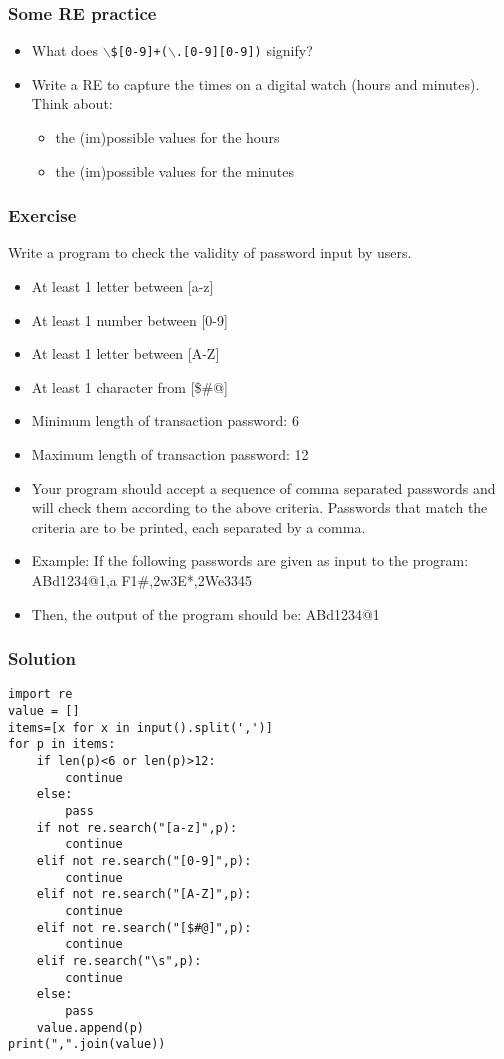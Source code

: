  \begin{frame}[fragile]
\frametitle{Some RE practice}

\begin{itemize}
\item What does \texttt{$\backslash$\$[0-9]+($\backslash$.[0-9][0-9])} signify?
\item Write a RE to capture the times on a digital watch (hours and minutes).  Think about:
	\begin{itemize}
	\item the (im)possible values for the hours
	\item the (im)possible values for the minutes
	\end{itemize}
\end{itemize}
\end{frame}

 \begin{frame}[fragile]\frametitle{Exercise}
Write a program to check the validity of password input by users.
  \begin{itemize}
  \item At least 1 letter between [a-z]
  \item At least 1 number between [0-9]
  \item At least 1 letter between [A-Z]
  \item At least 1 character from [\$\#@]
  \item Minimum length of transaction password: 6
  \item Maximum length of transaction password: 12
  \item Your program should accept a sequence of comma separated passwords and will check them according to the above criteria. Passwords that match the criteria are to be printed, each separated by a comma.
  \item Example: If the following passwords are given as input to the program: ABd1234@1,a F1\#,2w3E*,2We3345
  \item Then, the output of the program should be: ABd1234@1
  \end{itemize}  
\end{frame}

 \begin{frame}[fragile]\frametitle{Solution}
  \begin{lstlisting}
import re
value = []
items=[x for x in input().split(',')]
for p in items:
    if len(p)<6 or len(p)>12:
        continue
    else:
        pass
    if not re.search("[a-z]",p):
        continue
    elif not re.search("[0-9]",p):
        continue
    elif not re.search("[A-Z]",p):
        continue
    elif not re.search("[$#@]",p):
        continue
    elif re.search("\s",p):
        continue
    else:
        pass
    value.append(p)
print(",".join(value))
  \end{lstlisting}
\end{frame}

